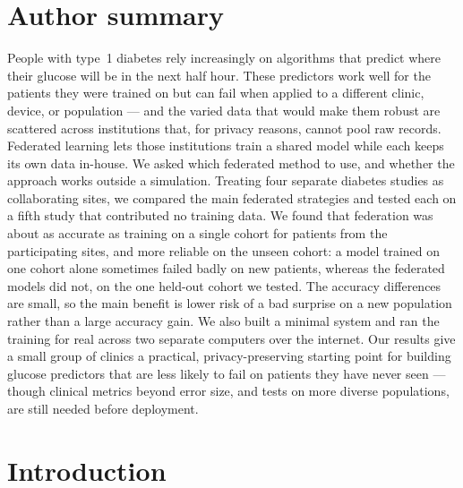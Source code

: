 \documentclass[10pt,letterpaper]{article}
\begin{document}
\section*{Author summary}
People with type~1 diabetes rely increasingly on algorithms that predict where
their glucose will be in the next half hour. These predictors work well for the
patients they were trained on but can fail when applied to a different clinic,
device, or population --- and the varied data that would make them robust are
scattered across institutions that, for privacy reasons, cannot pool raw
records. Federated learning lets those institutions train a shared model while
each keeps its own data in-house. We asked which federated method to use, and
whether the approach works outside a simulation. Treating four separate
diabetes studies as collaborating sites, we compared the main federated
strategies and tested each on a fifth study that contributed no training data.
We found that federation was about as accurate as training on a single cohort
for patients from the participating sites, and more reliable on the unseen
cohort: a model trained on one cohort alone sometimes failed badly on new
patients, whereas the federated models did not, on the one held-out cohort we
tested. The accuracy differences are
small, so the main benefit is lower risk of a bad surprise on a new population
rather than a large accuracy gain. We also built a minimal system and ran the
training for real across two separate computers over the internet. Our results
give a small group of clinics a practical, privacy-preserving starting point for
building glucose predictors that are less likely to fail on patients they have
never seen --- though clinical metrics beyond error size, and tests on more
diverse populations, are still needed before deployment.

\clearpage
{}
\linenumbers

\section*{Introduction}
\end{document}
